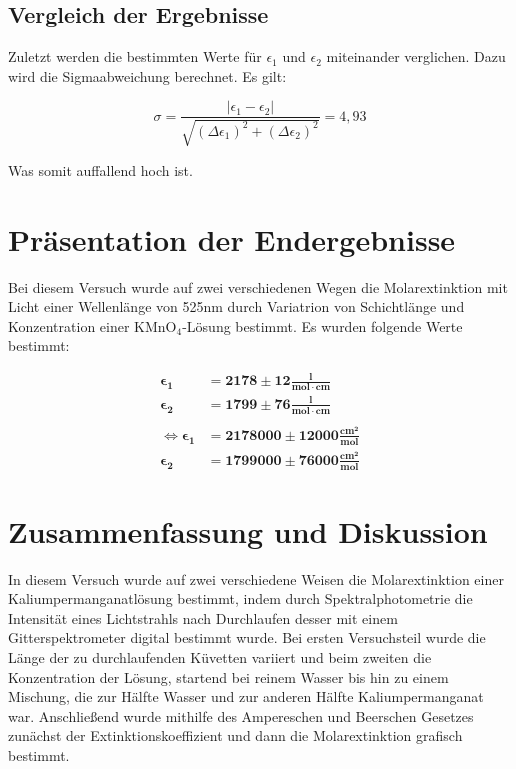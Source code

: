 \documentclass{article}
\begin{document}
\subsection{Vergleich der Ergebnisse}

Zuletzt werden die bestimmten Werte für $\epsilon_1$ und $\epsilon_2$ miteinander verglichen. Dazu wird die Sigmaabweichung berechnet. Es gilt:

\begin{equation}
    \sigma = \frac{\left| \epsilon_1 - \epsilon_2 \right|}{\sqrt{(\Delta \epsilon_1)^2 + (\Delta \epsilon_2)^2}} = 4,93
\end{equation}

Was somit auffallend hoch ist.

\newpage
\section{Präsentation der Endergebnisse}

Bei diesem Versuch wurde auf zwei verschiedenen Wegen die Molarextinktion mit Licht einer Wellenlänge von 525nm durch Variatrion von Schichtlänge und Konzentration einer KMnO$_4$-Lösung bestimmt. Es wurden folgende Werte bestimmt:

\begin{equation}
    \begin{split}
        \bm{\epsilon_1} &= \bm{2178 \pm 12 \frac{l}{mol \cdot cm}} \\
        \bm{\epsilon_2} &= \bm{1799 \pm 76 \frac{l}{mol \cdot cm}} \\ \\
        \iff \bm{\epsilon_1} &= \bm{2178000 \pm 12000 \frac{cm^2}{mol}} \\
        \bm{\epsilon_2} &= \bm{1799000 \pm 76000 \frac{cm^2}{mol}}
    \end{split}
\end{equation}

\newpage
\section{Zusammenfassung und Diskussion}

In diesem Versuch wurde auf zwei verschiedene Weisen die Molarextinktion einer Kaliumpermanganatlösung bestimmt, indem durch Spektralphotometrie die Intensität eines Lichtstrahls nach Durchlaufen desser mit einem Gitterspektrometer digital bestimmt wurde. Bei ersten Versuchsteil wurde die Länge der zu durchlaufenden Küvetten variiert und beim zweiten die Konzentration der Lösung, startend bei reinem Wasser bis hin zu einem Mischung, die zur Hälfte Wasser und zur anderen Hälfte Kaliumpermanganat war. Anschließend wurde mithilfe des Ampereschen und Beerschen Gesetzes zunächst der Extinktionskoeffizient und dann die Molarextinktion grafisch bestimmt.
\end{document}
